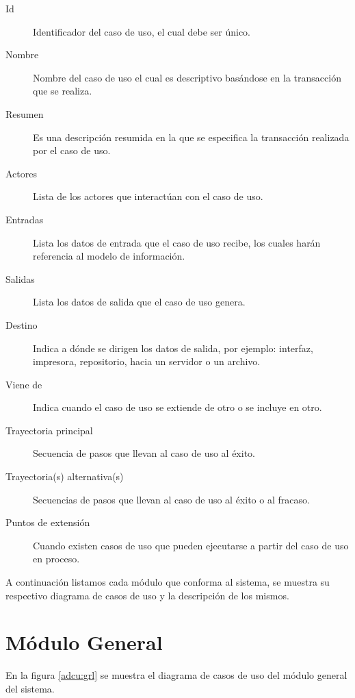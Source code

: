 \begin{description}
	\item[Id] Identificador del caso de uso, el cual debe ser único.
	\item[Nombre] Nombre del caso de uso el cual es descriptivo basándose en la transacción que se realiza.
	\item[Resumen] Es una descripción resumida en la que se especifica la transacción realizada por el caso de uso.
	\item[Actores] Lista de los actores que interactúan con el caso de uso.
	\item[Entradas] Lista los datos de entrada que el caso de uso recibe, los cuales harán referencia al modelo de información.
	\item[Salidas] Lista los datos de salida que el caso de uso genera.
	\item[Destino] Indica a dónde se dirigen los datos de salida, por ejemplo: interfaz, impresora, repositorio, hacia un servidor o un archivo.
	\item[Viene de] Indica cuando el caso de uso se extiende de otro o se incluye en otro.
	\item[Trayectoria principal] Secuencia de pasos que llevan al caso de uso al éxito.
	\item[Trayectoria(s) alternativa(s)] Secuencias de pasos que llevan al caso de uso al éxito o al fracaso.
	\item[Puntos de extensión] Cuando existen casos de uso que pueden ejecutarse a partir del caso de uso en proceso.
\end{description}

A continuación listamos cada módulo que conforma al sistema, se muestra su respectivo diagrama de casos de uso y la descripción de los mismos. 
\clearpage
\section{Módulo General}
	En la figura \ref{adcu:grl} se muestra el diagrama de casos de uso del módulo general del sistema.

